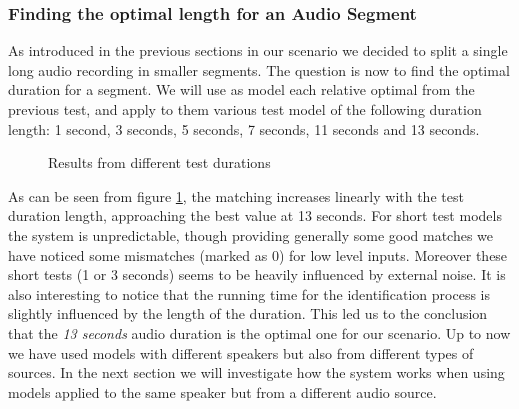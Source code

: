 \subsubsection{Finding the optimal length for an Audio Segment}

As introduced in the previous sections in our scenario we decided to split a single
long audio recording in smaller segments. The question is now to find the optimal duration
for a segment. We will use as model each relative optimal from the previous test, and apply to them
various test model of the following duration length: 1 second, 3 seconds, 5 seconds, 7 seconds,
11 seconds and 13 seconds.
\begin{figure}
\begin{center}


\caption{Results from different test durations}
\label{chart:score-test-dur}
\end{center}
\end{figure}

As can be seen from figure \ref{chart:score-test-dur}, the matching increases linearly with the test duration
length, approaching the best value at 13 seconds.\newline
For short test models the system is unpredictable, though providing generally some
good matches we have noticed some mismatches (marked as 0) for low level inputs. Moreover
these short tests (1 or 3 seconds) seems to be heavily influenced by external noise.\newline
It is also interesting to notice that the running time for the identification process is slightly
influenced by the length of the duration. This led us to the conclusion that the \textit{13 seconds}
audio duration is the optimal one for our scenario.\newline
Up to now we have used models with different speakers but also from different types of sources. In the
next section we will investigate how the system works when using models applied to the same
speaker but from a different audio source.



